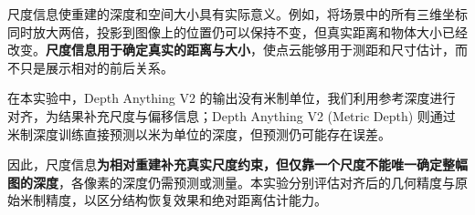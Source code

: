 尺度信息使重建的深度和空间大小具有实际意义。例如，将场景中的所有三维坐标同时放大两倍，投影到图像上的位置仍可以保持不变，但真实距离和物体大小已经改变。\textbf{尺度信息用于确定真实的距离与大小}，使点云能够用于测距和尺寸估计，而不只是展示相对的前后关系。

在本实验中，Depth Anything V2 的输出没有米制单位，我们利用参考深度进行对齐，为结果补充尺度与偏移信息；Depth Anything V2 (Metric Depth) 则通过米制深度训练直接预测以米为单位的深度，但预测仍可能存在误差。

因此，尺度信息\textbf{为相对重建补充真实尺度约束，但仅靠一个尺度不能唯一确定整幅图的深度}，各像素的深度仍需预测或测量。本实验分别评估对齐后的几何精度与原始米制精度，以区分结构恢复效果和绝对距离估计能力。
